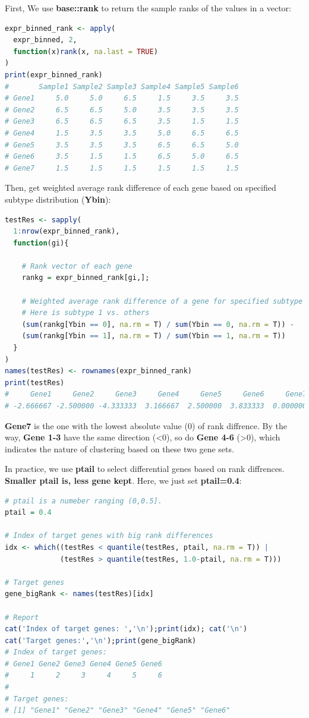 \documentclass[
  12pt,
]{book}
\begin{document}
First, We use \textbf{base::rank} to return the sample ranks of the values in a vector:

\begin{lstlisting}[language=R]
expr_binned_rank <- apply(
  expr_binned, 2, 
  function(x)rank(x, na.last = TRUE)
)
print(expr_binned_rank)
#       Sample1 Sample2 Sample3 Sample4 Sample5 Sample6
# Gene1     5.0     5.0     6.5     1.5     3.5     3.5
# Gene2     6.5     6.5     5.0     3.5     3.5     3.5
# Gene3     6.5     6.5     6.5     3.5     1.5     1.5
# Gene4     1.5     3.5     3.5     5.0     6.5     6.5
# Gene5     3.5     3.5     3.5     6.5     6.5     5.0
# Gene6     3.5     1.5     1.5     6.5     5.0     6.5
# Gene7     1.5     1.5     1.5     1.5     1.5     1.5
\end{lstlisting}

Then, get weighted average rank difference of each gene based on specified subtype distribution (\textbf{Ybin}):

\begin{lstlisting}[language=R]
testRes <- sapply(
  1:nrow(expr_binned_rank), 
  function(gi){
    
    # Rank vector of each gene
    rankg = expr_binned_rank[gi,];
    
    # Weighted average rank difference of a gene for specified subtype 
    # Here is subtype 1 vs. others
    (sum(rankg[Ybin == 0], na.rm = T) / sum(Ybin == 0, na.rm = T)) - 
    (sum(rankg[Ybin == 1], na.rm = T) / sum(Ybin == 1, na.rm = T))
  }
)
names(testRes) <- rownames(expr_binned_rank)
print(testRes)
#     Gene1     Gene2     Gene3     Gene4     Gene5     Gene6     Gene7 
# -2.666667 -2.500000 -4.333333  3.166667  2.500000  3.833333  0.000000
\end{lstlisting}

\textbf{Gene7} is the one with the lowest absolute value (0) of rank diffrence. By the way, \textbf{Gene 1-3} have the same direction (\textless0), so do \textbf{Gene 4-6} (\textgreater0), which indicates the nature of clustering based on these two gene sets.

In practice, we use \textbf{ptail} to select differential genes based on rank diffrences. \textbf{Smaller ptail is, less gene kept}. Here, we just set \textbf{ptail=0.4}:

\begin{lstlisting}[language=R]
# ptail is a numeber ranging (0,0.5].
ptail = 0.4

# Index of target genes with big rank differences
idx <- which((testRes < quantile(testRes, ptail, na.rm = T)) | 
             (testRes > quantile(testRes, 1.0-ptail, na.rm = T)))

# Target genes
gene_bigRank <- names(testRes)[idx]

# Report
cat('Index of target genes: ','\n');print(idx); cat('\n')
cat('Target genes:','\n');print(gene_bigRank)
# Index of target genes:  
# Gene1 Gene2 Gene3 Gene4 Gene5 Gene6 
#     1     2     3     4     5     6 
# 
# Target genes: 
# [1] "Gene1" "Gene2" "Gene3" "Gene4" "Gene5" "Gene6"
\end{lstlisting}
\end{document}
